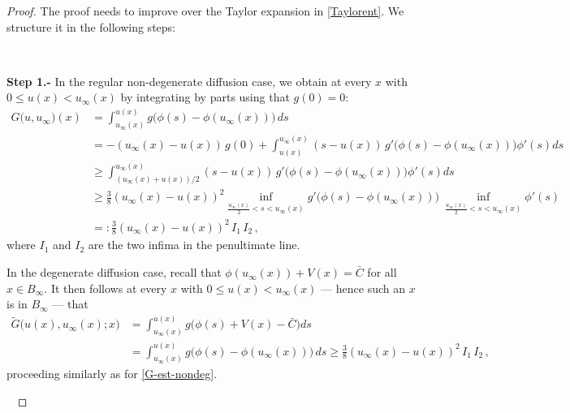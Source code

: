 \documentclass[10pt,a4paper]{amsart}
\newcommand{\uinf}{u_\infty}
\begin{document}
\begin{proof}
The proof needs to improve over the Taylor expansion in \eqref{Taylorent}. We structure it in the following steps:

\

{\bf Step 1.-}
In the regular non-degenerate diffusion case, we obtain
at every $x$ with $0\leq u(x)<\uinf(x)$ by integrating by parts using that $g(0)=0$:
 \begin{align}
        G\big(u,u_\infty\big)(x)
        &= \int^{u(x)}_{\uinf(x)} g\big(\phi(s)-\phi(\uinf(x))\big) \, ds \nonumber\\
        &= - (\uinf(x)-u(x))\,g(0) +\int
        _{u(x)}^{\uinf(x)}(s-u(x))\,g'\big(\phi(s)-\phi(\uinf(x))\big)\phi'(s)ds  \nonumber \\
        &\ge \int_{(\uinf(x)+u(x))/2}^{u_\infty(x)}(s-u(x))\,g'\big(\phi(s)-\phi(\uinf(x))\big)\phi'(s)ds \nonumber\\
        &\ge {\frac38} \left(\uinf(x)-u(x)\right)^2\inf_{\frac{\uinf(x)}2<s<\uinf(x)} g'\big(\phi(s)-\phi(\uinf(x))\big)\: \inf_{\frac{\uinf(x)}2<s<\uinf(x)}\phi'(s)\nonumber \\
        &=: {\frac38}\left(\uinf(x)-u(x)\right)^2 \, I_1\, I_2\,, \label{G-est-nondeg}
    \end{align}
where $I_1$ and $I_2$ are the two infima in the penultimate line.

In the degenerate diffusion case, recall that $\phi(u_\infty(x))+V(x)=\bar C$ for all $x\in B_\infty$. It then follows at every $x$ with $0\leq u(x) < \uinf(x)$ --- hence such an $x$ is in $B_\infty$ --- that
    \begin{align*}
        \tilde G\big(u(x),\uinf(x);x\big)
        &= \int^{u(x)}_{\uinf(x)} 
        g\big(\phi(s)+V(x)-\bar C\big)ds  \\
        &= \int^{u(x)}_{\uinf(x)} g\big(\phi(s)-\phi(\uinf(x))\big) \, ds 
        \geq {\frac38}\left(\uinf(x)-u(x)\right)^2 \, I_1\, I_2\,,
    \end{align*}
    proceeding similarly as for \eqref{G-est-nondeg}.

\


\end{proof}
\end{document}
